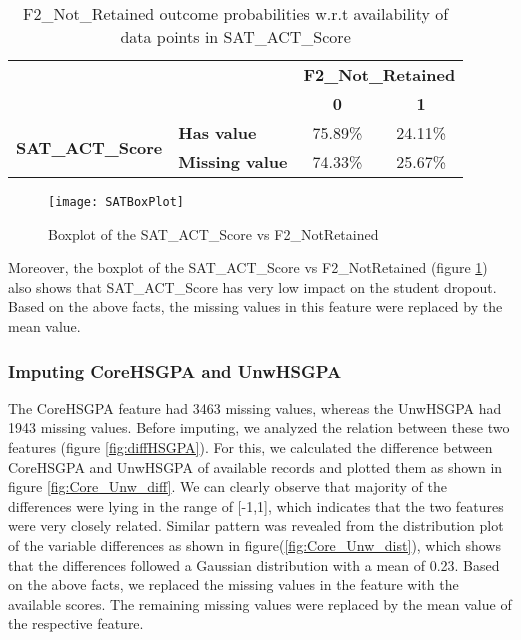 \documentclass[11pt,openright]{report}
\begin{document}
\begin{table}[!t]
	\renewcommand{\arraystretch}{1.3}
	\caption{F2\_Not\_Retained outcome probabilities w.r.t availability of data points  in SAT\_ACT\_Score}
	\label{table:sat_act_db}
	\centering
	\begin{tabular}{|c|l|c|c|}
    \hline
    \multicolumn{2}{|c|}{} & \multicolumn{2}{|c|}{ \bfseries F2\_Not\_Retained }\\ \cline{3-4}
      \multicolumn{2}{|c|}{} & \bfseries 0 & \bfseries 1\\ \hline
     \multirow{2}{*}{ \bfseries SAT\_ACT\_Score}   &  \bfseries Has value & 75.89\% & 24.11\% \\ \cline{2-4}
     & \bfseries Missing value & 74.33\% & 25.67\%\\
    \hline

\end{tabular}
\end{table}


\begin{figure}[!htbp]
	\centering
	\texttt{[image: SATBoxPlot]}
	\caption{Boxplot of the SAT\_ACT\_Score vs F2\_NotRetained}
	\label{fig:Sat_F2NotRetained_plot}
\end{figure}

Moreover, the boxplot of the SAT\_ACT\_Score vs F2\_NotRetained (figure \ref{fig:Sat_F2NotRetained_plot}) also shows that SAT\_ACT\_Score has very low impact on the student dropout. Based on the above facts, the missing values in this feature were replaced by the mean value. 

\subsubsection {Imputing CoreHSGPA and UnwHSGPA}
The CoreHSGPA feature had 3463 missing values, whereas the UnwHSGPA had 1943 missing values. Before imputing, we analyzed the relation between these two features (figure \ref{fig:diffHSGPA}). For this, we calculated the difference between CoreHSGPA and UnwHSGPA of available records and plotted them as shown in figure \ref{fig:Core_Unw_diff}. We can clearly observe that majority of the differences were lying in the range of [-1,1], which indicates that the two features were very closely related. Similar pattern was revealed from the distribution plot of the variable differences as shown in figure(\ref{fig:Core_Unw_dist}), which shows that the differences followed a Gaussian distribution with a mean of 0.23. Based on the above facts, we replaced the missing values in the feature with the available scores. The remaining missing values were replaced by the mean value of the respective feature.
\end{document}

